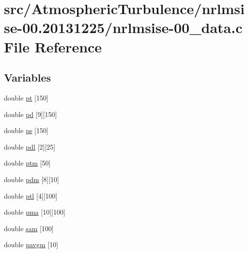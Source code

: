 \hypertarget{nrlmsise-00__data_8c}{\section{src/\+Atmospheric\+Turbulence/nrlmsise-\/00.20131225/nrlmsise-\/00\+\_\+data.c File Reference}
\label{nrlmsise-00__data_8c}
}
\subsection*{Variables}
\begin{DoxyCompactItemize}
\item 
double \hyperlink{nrlmsise-00__data_8c_aa3caa9a62f4d69b33356c093e59da51f}{pt} \mbox{[}150\mbox{]}
\item 
double \hyperlink{nrlmsise-00__data_8c_a9d7bc0edd2bc401a23d0bb6bbdcc261d}{pd} \mbox{[}9\mbox{]}\mbox{[}150\mbox{]}
\item 
double \hyperlink{nrlmsise-00__data_8c_ad4f203c6cf70efc738b56d4377ded829}{ps} \mbox{[}150\mbox{]}
\item 
double \hyperlink{nrlmsise-00__data_8c_adefb8cc23535073a700d4009d0343679}{pdl} \mbox{[}2\mbox{]}\mbox{[}25\mbox{]}
\item 
double \hyperlink{nrlmsise-00__data_8c_a7d39dedd36f08d4f3ee17c979bf92332}{ptm} \mbox{[}50\mbox{]}
\item 
double \hyperlink{nrlmsise-00__data_8c_ac7ac86294545f793edad8b9574d73132}{pdm} \mbox{[}8\mbox{]}\mbox{[}10\mbox{]}
\item 
double \hyperlink{nrlmsise-00__data_8c_a34941bdba8aa11fb952a012ae87fd02c}{ptl} \mbox{[}4\mbox{]}\mbox{[}100\mbox{]}
\item 
double \hyperlink{nrlmsise-00__data_8c_afc39d71d3e372c3178c33a31ee91d713}{pma} \mbox{[}10\mbox{]}\mbox{[}100\mbox{]}
\item 
double \hyperlink{nrlmsise-00__data_8c_ae391523526f8ec527742657b4f50db0e}{sam} \mbox{[}100\mbox{]}
\item 
double \hyperlink{nrlmsise-00__data_8c_ad9e05d1fb99e07d634b35cdde6c978dc}{pavgm} \mbox{[}10\mbox{]}
\end{DoxyCompactItemize}


